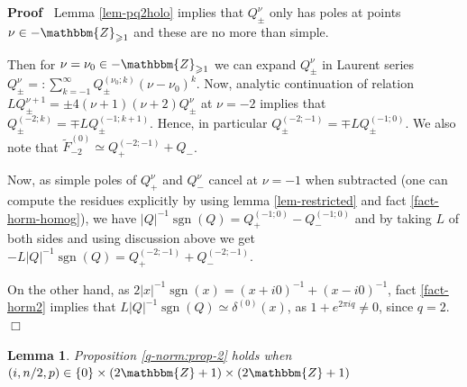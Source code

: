 \documentclass{article}
\newcommand{\tmop}[1]{\ensuremath{\operatorname{#1}}}
\newenvironment{proof}{\noindent\textbf{Proof\ }}{\hspace*{\fill}$\Box$\medskip}
\numberwithin{definition}{section}
\newtheorem{lemma}{Lemma}
\numberwithin{lemma}{section}
\numberwithin{proposition}{section}
{\theorembodyfont{\rmfamily}\newtheorem{remark}{Remark}
\numberwithin{remark}{section}
}
\begin{document}
\begin{proof}
  Lemma \ref{lem-pq2holo} implies that $Q_{\pm}^{\nu}$ only has poles at
  points $\nu \in -\mathbbm{Z}_{\geqslant 1}$ and these are no more than
  simple.
  
  Then for $\nu = \nu_0 \in -\mathbbm{Z}_{\geqslant 1}$ we can expand
  $Q_{\pm}^{\nu}$ in Laurent series $Q^{\nu}_{\pm} = : \sum_{k = - 1}^{\infty}
  Q_{\pm}^{( \nu_0 ; k)} ( \nu - \nu_0)^k$. Now, analytic continuation of
  relation $L Q_{\pm}^{\nu + 1} = \pm 4 ( \nu + 1) ( \nu + 2) Q_{\pm}^{\nu}$
  at $\nu = - 2$ implies that $Q_{\pm}^{( - 2 ; k)} = \mp L Q_{\pm}^{( - 1 ; k
  + 1)}$. Hence, in particular $Q_{\pm}^{( - 2 ; - 1)} = \mp L Q_{\pm}^{( - 1
  ; 0)}$. We also note that $\tilde{F}^{( 0)}_{- 2} \simeq Q_+^{( - 2 ; - 1)}
  + Q_-$.
  
  Now, as simple poles of $Q_+^{\nu}$ and $Q_-^{\nu}$ cancel at $\nu = - 1$
  when subtracted (one can compute the residues explicitly by using lemma
  \ref{lem-restricted} and fact \ref{fact-horm-homog}), we have $| Q |^{- 1}
  \tmop{sgn} ( Q) = Q_+^{( - 1 ; 0)} - Q_-^{( - 1 ; 0)}$ and by taking $L$ of
  both sides and using discussion above we get $- L | Q |^{- 1} \tmop{sgn} (
  Q) = Q_+^{( - 2 ; - 1)} + Q_-^{( - 2 ; - 1)}$.
  
  On the other hand, as $2 | x |^{- 1} \tmop{sgn} ( x) = ( x + i 0)^{- 1} + (
  x - i 0)^{- 1}$, fact \ref{fact-horm2} implies that $L | Q |^{- 1}
  \tmop{sgn} ( Q) \simeq \delta^{( 0)} ( x)$, as $1 + e^{2 \pi i q} \neq 0$,
  since $q = 2$.
\end{proof}

\begin{lemma}
  \label{lem-r6}Proposition \ref{q-norm:prop-2} holds when $( i, n / 2, p) \in
  \{ 0 \} \times ( 2\mathbbm{Z}+ 1) \times ( 2\mathbbm{Z}+ 1)$
\end{lemma}
\end{document}

